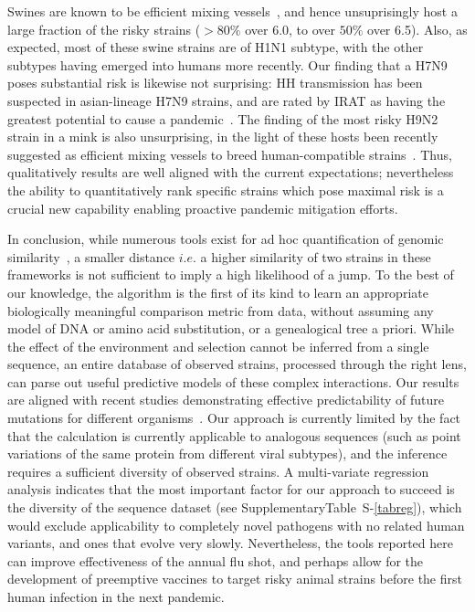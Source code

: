 \documentclass[onecolumn, compsoc,10pt]{IEEEtran}
\def\SUPPLEMENTARY{Supplementary}
\begin{document}
Swines are known to be efficient mixing vessels~\cite{ma2009pig,nelson2018origins,reid2003origin,Baumann}, and hence unsuprisingly host a large fraction of the risky strains ($>80\%$ over 6.0, to over $50\%$ over 6.5). Also, as  expected, most of these swine strains are of  H1N1 subtype, with the other subtypes  having emerged into humans more recently. Our finding that a H7N9 poses substantial risk is likewise not surprising:
HH transmission has been suspected in asian-lineage H7N9 strains, and are rated by IRAT as having the greatest potential to cause a pandemic~\cite{qi2013probable}. The finding of  the most risky H9N2 strain in a mink is also unsurprising, in the light of these hosts  been recently suggested as efficient mixing vessels to breed human-compatible strains~\cite{sun2021mink}. Thus,  qualitatively results  are well aligned with the current expectations; nevertheless the ability to quantitatively rank  specific strains which pose maximal risk is a crucial new capability enabling proactive pandemic mitigation efforts.

In conclusion, while numerous tools exist for ad hoc quantification of genomic similarity~\cite{posada1998modeltest,goldberger2005genomic,huelsenbeck1997phylogeny,neher2014predicting,VanderMeer2010,Smith2009}, a smaller  distance $i.e.$ a higher similarity of two strains in  these frameworks is not sufficient to imply a high likelihood of a jump. To the best of our knowledge, the \enet algorithm is  the first of its kind to learn an appropriate biologically meaningful comparison metric from data, without assuming any model of DNA or amino acid substitution, or a genealogical tree a priori. While the effect of the environment and selection cannot be inferred from a single sequence, an entire database of observed strains, processed through the right lens, can parse out useful predictive models of these complex interactions. Our results are  aligned with recent studies demonstrating effective  predictability of  future mutations  for different organisms~\cite{mollentze2021identifying,maher2021predicting}. Our approach   is currently limited by the fact that the \qdist calculation is currently applicable to analogous sequences (such as point variations of the same protein from different viral subtypes), and the \enet inference requires a  sufficient diversity of observed strains. A multi-variate regression analysis indicates  that the most important factor for our approach to succeed is  the diversity of the sequence dataset (see \SUPPLEMENTARY  Table~S-\ref{tabreg}), which would exclude applicability to completely novel pathogens with no related human variants, and ones that evolve very slowly. Nevertheless, the tools reported here can improve effectiveness of the annual flu shot, and perhaps allow for the development of preemptive vaccines to  target risky animal strains  before the first human infection in the next pandemic.
\end{document}
